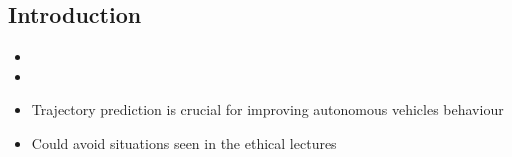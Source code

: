\documentclass[a0,portrait]{a0poster}
\begin{document}
\begin{multicols}{2} %


\color{DarkSlateGray}%





\color{DarkSlateGray} %

\section*{Introduction}

\begin{itemize}
	\justifying
\item
\item
\item Trajectory prediction is crucial for improving autonomous vehicles behaviour
\item Could avoid situations seen in the ethical lectures
\end{itemize}



\color{DarkSlateGray} %


\end{multicols}
\end{document}
